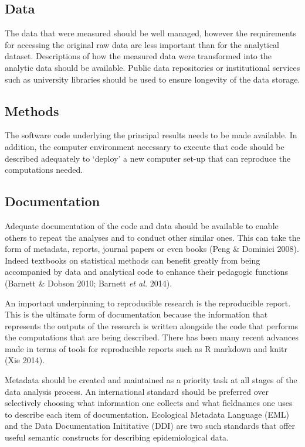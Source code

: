 \documentclass[11pt,a4paper]{article}
\begin{document}
\subsection{Data}\label{data}

The data that were measured should be well managed, however the
requirements for accessing the original raw data are less important than
for the analytical dataset. Descriptions of how the measured data were
transformed into the analytic data should be available. Public data
repositories or institutional services such as university libraries
should be used to ensure longevity of the data storage.

\subsection{Methods}\label{methods}

The software code underlying the principal results needs to be made
available. In addition, the computer environment necessary to execute
that code should be described adequately to `deploy' a new computer
set-up that can reproduce the computations needed.

\subsection{Documentation}\label{documentation}

Adequate documentation of the code and data should be available to
enable others to repeat the analyses and to conduct other similar ones.
This can take the form of metadata, reports, journal papers or even
books (Peng \& Dominici 2008). Indeed textbooks on statistical methods
can benefit greatly from being accompanied by data and analytical code
to enhance their pedagogic functions (Barnett \& Dobson 2010; Barnett
\emph{et al.} 2014).

An important underpinning to reproducible research is the reproducible
report. This is the ultimate form of documentation because the
information that represents the outputs of the research is written
alongside the code that performs the computations that are being
described. There has been many recent advances made in terms of tools
for reproducible reports such as R markdown and knitr (Xie 2014).

Metadata should be created and maintained as a priority task at all
stages of the data analysis process. An international standard should be
preferred over selectively choosing what information one collects and
what fieldnames one uses to describe each item of documentation.
Ecological Metadata Language (EML) and the Data Documentation
Inititative (DDI) are two such standards that offer useful semantic
constructs for describing epidemiological data.
\end{document}
